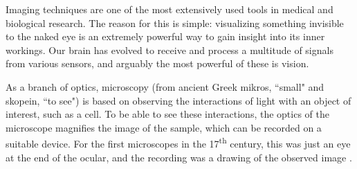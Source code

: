 













% 


Imaging techniques
are one of the most extensively used tools
in medical and biological research. The reason for this is simple: visualizing something invisible to the naked eye is an extremely powerful way to gain insight into its inner workings. Our brain has evolved to receive and process a multitude of signals from various sensors, and arguably the most powerful of these is vision.

As a branch of optics, microscopy (from ancient Greek mikros, ``small" and skopein, ``to see") is based on observing the interactions of light with an object of interest, such as a cell. To be able to see these interactions, the optics of the microscope magnifies the image of the sample, which can be recorded on a suitable device. For the first microscopes in the 17\textsuperscript{th} century, this was just an eye at the end of the ocular, and the recording was a drawing of the observed image \cite{hooke_micrographia:_1665}.

